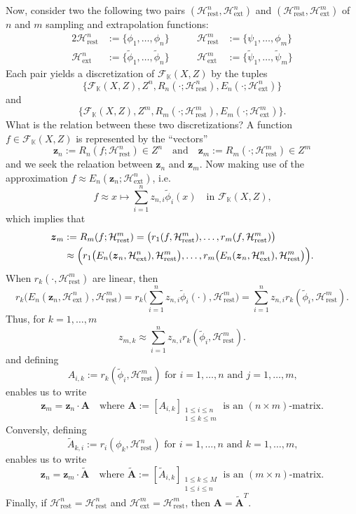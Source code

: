 \documentclass[a4paper]{article}
\newcommand{\cH}{\mathcal{H}}
\newcommand{\bz}{\boldsymbol{z}}
\newcommand{\bA}{\boldsymbol{A}}
\newcommand{\cF}{\mathcal{F}}
\newcommand{\K}{\mathbb{K}}
\newcommand{\ext}{\text{ext}}
\newcommand{\rest}{\text{rest}}
\newcommand{\wt}[1]{\widetilde{#1}}
\begin{document}
Now, consider two the following two pairs $(\cH^n_{\rest},\cH^n_{\ext})$ and 
$(\cH^m_{\rest},\cH^m_{\ext})$ of $n$ and $m$ sampling and extrapolation 
functions:
\begin{alignat*}{2}
  \cH^n_{\rest} &:=\{ \phi_{1},\ldots,\phi_{n} \} &\qquad
  \cH^m_{\rest} &:=\{ \psi_{1},\ldots,\phi_{m} \}  \\
  \cH^n_{\ext} &:=\{ \wt{\phi}_{1},\ldots,\wt{\phi}_{n} \} &\qquad
  \cH^m_{\ext} &:=\{ \wt{\psi}_{1},\ldots,\wt{\psi}_{m} \}    
\end{alignat*}
Each pair yields a discretization of $\cF_{\K}(X,Z)$ by the tuples
\[ 
   \bigl\{
     \cF_{\K}(X,Z),Z^n,R_{n}(\cdot;\cH^n_{\rest}),E_{n}(\cdot;\cH^n_{\ext})
   \bigr\} \]
and
\[ \bigl\{
     \cF_{\K}(X,Z),Z^m,R_{m}(\cdot;\cH^m_{\rest}),E_{m}(\cdot;\cH^m_{\ext})
   \bigr\}. \] 
What is the relation between these two discretizations? A function 
$f\in \cF_{\K}(X,Z)$ is represented by the ``vectors'' 
\[ \bz_{n}:= R_{n}(f;\cH^n_{\rest})\in Z^n \quad\text{and}\quad
   \bz_{m}:= R_{m}(\cdot;\cH^m_{\rest})\in Z^m \]
and we seek the relaation between $\bz_{n}$ and $\bz_{m}$. 
Now making use of the approximation $f\approx 
E_{n}(\bz_{n};\cH^n_{\ext})$, i.e.\@
\[ f \approx x \mapsto 
       \sum_{i=1}^n z_{n,i} \wt{\phi}_{i}(x)
   \quad\text{in $\cF_{\K}(X,Z)$,} 
\]
which implies that
\begin{align*}
  \bz_{m} &:=R_{m}(f;\cH^m_{\rest}) =
    \bigl( r_{1}(f,\cH^m_{\rest}),\ldots,r_{m}(f,\cH^m_{\rest}) \bigr) \\
    &\approx 
      \Bigl( r_{1}\bigl(E_{n}(\bz_{n},\cH^n_{\ext}),\cH^m_{\rest}\bigr),
             \ldots,
	     r_{m}\bigl(E_{n}(\bz_{n},\cH^n_{\ext}),\cH^m_{\rest}\bigr)
      \Bigr).
\end{align*}
When $r_{k}(\cdot,\cH^m_{\rest})$ are linear, then 
\[ r_{k}\bigl(E_{n}(\bz_{n},\cH^n_{\ext}),\cH^m_{\rest}\bigr)=
     r_{k}\biggl(\sum_{i=1}^n 
       z_{n,i}\wt{\phi}_{i}(\cdot),\cH^m_{\rest}\biggr)=
     \sum_{i=1}^n z_{n,i} r_{k}(\wt{\phi}_{i},\cH^m_{\rest}).
\]   
Thus, for $k=1,\ldots,m$
\[
  z_{m,k}\approx 
    \sum_{i=1}^n z_{n,i} r_{k}(\wt{\phi}_{i},\cH^m_{\rest}).
\]    
and defining 
\[ A_{i,k}:= r_{k}(\wt{\phi}_{i},\cH^m_{\rest})
   \text{ for $i=1,\ldots,n$ and $j=1,\ldots,m$,} \]
enables us to write
\[ \bz_{m}=\bz_{n}\cdot\bA
   \quad\text{where } 
   \bA:=[ A_{i,k} ]_{\substack{1\leq i \leq n \\ 1\leq k \leq m}}
   \text{ is an $(n\times m)$-matrix.} \]
Conversly, defining 
\[ \wt{A}_{k,i}:=r_{i}(\phi_{k},\cH^n_{\rest})
   \text{ for $i=1,\ldots,n$ and $k=1,\ldots,m$,} \]
enables us to write
\[ \bz_{n}=\bz_{m}\cdot\wt{\bA}
   \quad\text{where } 
   \wt{\bA}:=[ \wt{A}_{i,k} ]_{\substack{1\leq k \leq M \\ 
   1\leq i \leq n}}
   \text{ is an $(m\times n)$-matrix.} \]
Finally, if $\cH^n_{\rest}=\cH^n_{\rest}$ and 
$\cH^m_{\ext}=\cH^m_{\rest}$, then $\bA=\wt{\bA}^T$.   
\end{document}
